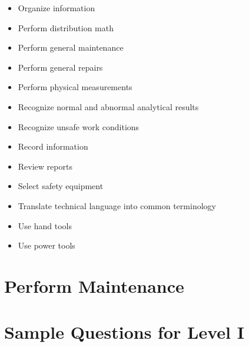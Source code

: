 \documentclass[10pt]{article}
\begin{document}
\begin{itemize}
  \item Organize information

  \item Perform distribution math

  \item Perform general maintenance

  \item Perform general repairs

  \item Perform physical measurements

  \item Recognize normal and abnormal analytical results

  \item Recognize unsafe work conditions

  \item Record information

  \item Review reports

  \item Select safety equipment

  \item Translate technical language into common terminology

  \item Use hand tools

  \item Use power tools

\end{itemize}

\section{Perform Maintenance}
\section{Sample Questions for Level I}
\end{document}
